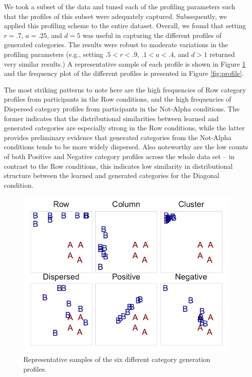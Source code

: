 \documentclass[10pt,letterpaper]{article}
\begin{document}
We took a subset of the data and tuned each of the profiling parameters such that the profiles of this subset were
adequately captured. Subsequently, we applied this profiling scheme to the entire dataset. Overall, we found that
setting $r = .7$, $a = .25$, and $d = 5$ was useful in capturing the different profiles of generated categories. The
results were robust to moderate variations in the profiling parameters (e.g., setting $.5 < r < .9$, $.1 < a < .4$, and
$ d > 1 $ returned very similar results.) A representative sample of each profile is shown in Figure \ref{fig:samples}
and the frequency plot of the different profiles is presented in Figure \ref{fig:profile}.

The most striking patterns to note here are the high frequencies of Row category profiles from participants in the Row conditions, and the high frequencies of Dispersed category profiles from participants in the Not-Alpha conditions. The former indicates that the distributional similarities between learned and generated categories are especially strong in the Row conditions, while the latter provides preliminary evidence that generated categories from the Not-Alpha conditions tends to be more widely dispersed. Also noteworthy are the low counts of both Positive and Negative category profiles across the whole data set -- in contrast to the Row conditions, this indicates low similarity in distributional structure between the learned and generated categories for the Diagonal condition.


\begin{figure}[H]
\begin{center}
    \includegraphics[width=.5\textwidth]{Figures/samples.pdf}
\end{center}
\caption{Representative samples of the six different category generation profiles.} 
\label{fig:samples}
\end{figure}
\end{document}
